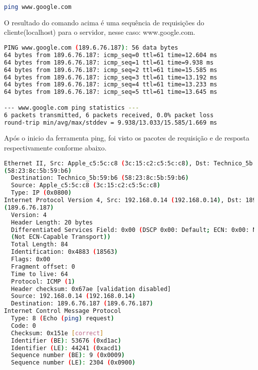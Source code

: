 \documentclass[a4paper]{report} %
\begin{document}
\begin{lstlisting}[language=bash]
ping www.google.com
\end{lstlisting}

O resultado do comando acima é uma sequência de requisições do cliente(localhost) para o servidor, nesse caso: www.google.com.

\begin{lstlisting}[language=bash]
PING www.google.com (189.6.76.187): 56 data bytes
64 bytes from 189.6.76.187: icmp_seq=0 ttl=61 time=12.604 ms
64 bytes from 189.6.76.187: icmp_seq=1 ttl=61 time=9.938 ms
64 bytes from 189.6.76.187: icmp_seq=2 ttl=61 time=15.585 ms
64 bytes from 189.6.76.187: icmp_seq=3 ttl=61 time=13.192 ms
64 bytes from 189.6.76.187: icmp_seq=4 ttl=61 time=13.233 ms
64 bytes from 189.6.76.187: icmp_seq=5 ttl=61 time=13.645 ms

--- www.google.com ping statistics ---
6 packets transmitted, 6 packets received, 0.0% packet loss
round-trip min/avg/max/stddev = 9.938/13.033/15.585/1.669 ms
\end{lstlisting}

Após o inicio da ferramenta ping, foi visto os pacotes de requisição e de resposta respectivamente conforme abaixo.

\begin{lstlisting}[language=bash]
Ethernet II, Src: Apple_c5:5c:c8 (3c:15:c2:c5:5c:c8), Dst: Technico_5b:59:b6
(58:23:8c:5b:59:b6)
  Destination: Technico_5b:59:b6 (58:23:8c:5b:59:b6)
  Source: Apple_c5:5c:c8 (3c:15:c2:c5:5c:c8)
  Type: IP (0x0800)
Internet Protocol Version 4, Src: 192.168.0.14 (192.168.0.14), Dst: 189.6.76.187
(189.6.76.187)
  Version: 4
  Header Length: 20 bytes
  Differentiated Services Field: 0x00 (DSCP 0x00: Default; ECN: 0x00: Not-ECT
  (Not ECN-Capable Transport))
  Total Length: 84
  Identification: 0x4883 (18563)
  Flags: 0x00
  Fragment offset: 0
  Time to live: 64
  Protocol: ICMP (1)
  Header checksum: 0x67ae [validation disabled]
  Source: 192.168.0.14 (192.168.0.14)
  Destination: 189.6.76.187 (189.6.76.187)
Internet Control Message Protocol
  Type: 8 (Echo (ping) request)
  Code: 0
  Checksum: 0x151e [correct]
  Identifier (BE): 53676 (0xd1ac)
  Identifier (LE): 44241 (0xacd1)
  Sequence number (BE): 9 (0x0009)
  Sequence number (LE): 2304 (0x0900)
\end{lstlisting}
\end{document}
